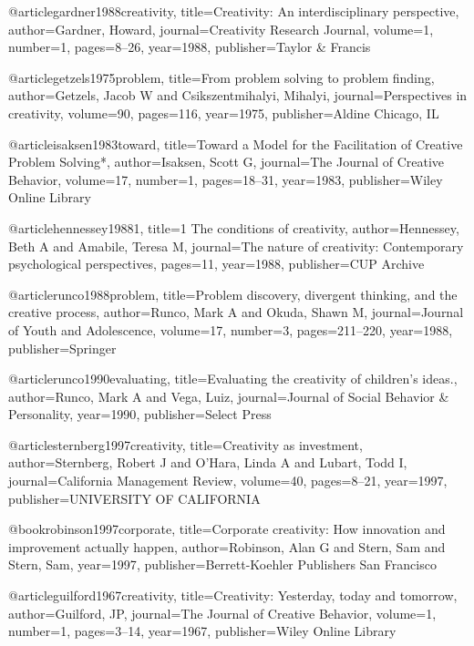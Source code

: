 @article{gardner1988creativity,
  title={Creativity: An interdisciplinary perspective},
  author={Gardner, Howard},
  journal={Creativity Research Journal},
  volume={1},
  number={1},
  pages={8--26},
  year={1988},
  publisher={Taylor \& Francis}
}

@article{getzels1975problem,
  title={From problem solving to problem finding},
  author={Getzels, Jacob W and Csikszentmihalyi, Mihalyi},
  journal={Perspectives in creativity},
  volume={90},
  pages={116},
  year={1975},
  publisher={Aldine Chicago, IL}
}

@article{isaksen1983toward,
  title={Toward a Model for the Facilitation of Creative Problem Solving*},
  author={Isaksen, Scott G},
  journal={The Journal of Creative Behavior},
  volume={17},
  number={1},
  pages={18--31},
  year={1983},
  publisher={Wiley Online Library}
}

@article{hennessey19881,
  title={1 The conditions of creativity},
  author={Hennessey, Beth A and Amabile, Teresa M},
  journal={The nature of creativity: Contemporary psychological perspectives},
  pages={11},
  year={1988},
  publisher={CUP Archive}
}

@article{runco1988problem,
  title={Problem discovery, divergent thinking, and the creative process},
  author={Runco, Mark A and Okuda, Shawn M},
  journal={Journal of Youth and Adolescence},
  volume={17},
  number={3},
  pages={211--220},
  year={1988},
  publisher={Springer}
}

@article{runco1990evaluating,
  title={Evaluating the creativity of children's ideas.},
  author={Runco, Mark A and Vega, Luiz},
  journal={Journal of Social Behavior \& Personality},
  year={1990},
  publisher={Select Press}
}

@article{sternberg1997creativity,
  title={Creativity as investment},
  author={Sternberg, Robert J and O'Hara, Linda A and Lubart, Todd I},
  journal={California Management Review},
  volume={40},
  pages={8--21},
  year={1997},
  publisher={UNIVERSITY OF CALIFORNIA}
}

@book{robinson1997corporate,
  title={Corporate creativity: How innovation and improvement actually happen},
  author={Robinson, Alan G and Stern, Sam and Stern, Sam},
  year={1997},
  publisher={Berrett-Koehler Publishers San Francisco}
}

@article{guilford1967creativity,
  title={Creativity: Yesterday, today and tomorrow},
  author={Guilford, JP},
  journal={The Journal of Creative Behavior},
  volume={1},
  number={1},
  pages={3--14},
  year={1967},
  publisher={Wiley Online Library}
}

